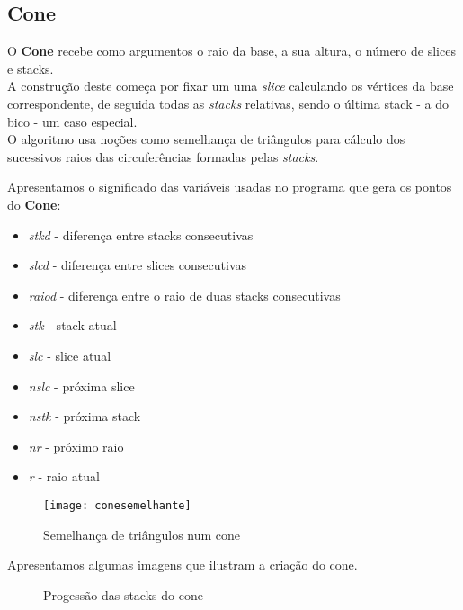 \documentclass{article}
\begin{document}
\subsection{Cone}
O \textbf{Cone} recebe como argumentos o raio da base, a sua altura, o número de slices e stacks. \\
A construção deste começa por fixar um uma \textit{slice} calculando os vértices da base correspondente, de seguida todas as \textit{stacks} relativas, sendo o última stack - a do bico - um caso especial. \\
O algoritmo usa noções como semelhança de triângulos para cálculo dos sucessivos raios das circuferências formadas pelas \textit{stacks}.\\

\begin{info}
	Apresentamos o significado das variáveis usadas no programa que gera os pontos do \textbf{Cone}: 
	\begin{itemize}
		\item[] \textit{stkd} - diferença entre stacks consecutivas
		\item[] \textit{slcd} - diferença entre slices consecutivas
		\item[] \textit{raiod} - diferença entre o raio de duas stacks consecutivas
		\item[] \textit{stk} - stack atual 
		\item[] \textit{slc} - slice atual
		\item[] \textit{nslc} - próxima slice
		\item[] \textit{nstk} - próxima stack
		\item[] \textit{nr} - próximo raio
		\item[] \textit{r} - raio atual
	\end{itemize}
\end{info}

\begin{figure}[H]
	\centering
	\texttt{[image: conesemelhante]}
	\caption{Semelhança de triângulos num cone}
\end{figure}

Apresentamos algumas imagens que ilustram a criação do cone. \\

\begin{figure}[H]
	\centering
	\hspace{2cm}
	\caption{Progessão das stacks do cone}
\end{figure}
\end{document}
